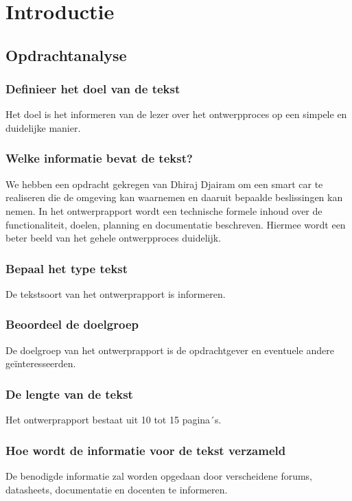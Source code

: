 \section{Introductie}
\subsection{Opdrachtanalyse}
\subsubsection{Definieer het doel van de tekst}
Het doel is het informeren van de lezer over het ontwerpproces op een simpele en duidelijke manier.  

\subsubsection{Welke informatie bevat de tekst?}
We hebben een opdracht gekregen van Dhiraj Djairam om een smart car te realiseren die de omgeving kan waarnemen en daaruit bepaalde beslissingen kan nemen. In het ontwerprapport wordt een technische formele inhoud over de functionaliteit, doelen, planning en documentatie beschreven. Hiermee wordt een beter beeld van het gehele ontwerpproces duidelijk.

\subsubsection{Bepaal het type tekst}
De tekstsoort van het ontwerprapport is informeren. 

\subsubsection{Beoordeel de doelgroep}
De doelgroep van het ontwerprapport is de opdrachtgever en eventuele andere geïnteresseerden.

\subsubsection{De lengte van de tekst}
Het ontwerprapport bestaat uit 10 tot 15 pagina´s.

\subsubsection{Hoe wordt de informatie voor de tekst verzameld}
De benodigde informatie zal worden opgedaan door verscheidene forums, datasheets, documentatie en docenten te informeren.

